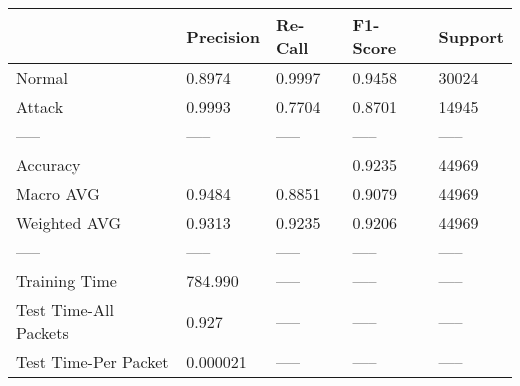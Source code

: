 \begin{tabular}{lllll}
\toprule
{} & Precision & Re-Call & F1-Score & Support \\
\midrule
Normal                &    0.8974 &  0.9997 &   0.9458 &   30024 \\
Attack                &    0.9993 &  0.7704 &   0.8701 &   14945 \\
-----                 &     ----- &   ----- &    ----- &   ----- \\
Accuracy              &           &         &   0.9235 &   44969 \\
Macro AVG             &    0.9484 &  0.8851 &   0.9079 &   44969 \\
Weighted AVG          &    0.9313 &  0.9235 &   0.9206 &   44969 \\
-----                 &     ----- &   ----- &    ----- &   ----- \\
Training Time         &   784.990 &   ----- &    ----- &   ----- \\
Test Time-All Packets &     0.927 &   ----- &    ----- &   ----- \\
Test Time-Per Packet  &  0.000021 &   ----- &    ----- &   ----- \\
\bottomrule
\end{tabular}
